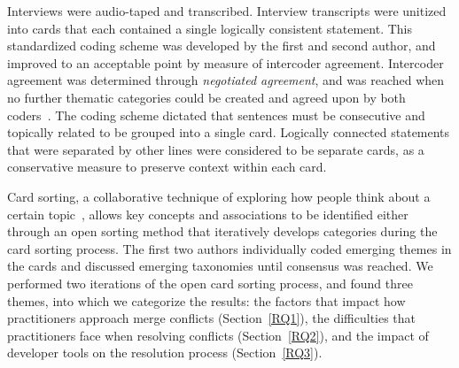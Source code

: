  Interviews were audio-taped and transcribed. Interview transcripts were unitized~\cite{unitization} into cards that each contained a single logically consistent statement. This standardized coding scheme was developed by the first and second author, and improved to an acceptable point by measure of intercoder agreement.
Intercoder agreement was determined through \textit{negotiated agreement}, and was reached when no further thematic categories could be created and agreed upon by both coders~\cite{garrison2006revisiting}\cite{ritchie2013qualitative}.
The coding scheme dictated that sentences must be consecutive and topically related to be grouped into a single card. Logically connected statements that were separated by other lines were considered to be separate cards, as a conservative measure to preserve context within each card.

Card sorting, a collaborative technique of exploring how people think about a certain topic~\cite{spencer2009card}\cite{card_sort},  allows key concepts and associations to be identified either through an open sorting method that iteratively develops categories during the card sorting process.
The first two authors individually coded emerging themes in the cards and discussed emerging taxonomies until consensus was reached.
We performed two iterations of the open card sorting process, and found three themes, into which we categorize the results: the factors that impact how practitioners approach merge conflicts (Section~\ref{RQ1}), the difficulties that practitioners face when resolving conflicts (Section~\ref{RQ2}), and the impact of developer tools on the resolution process (Section~\ref{RQ3}).


